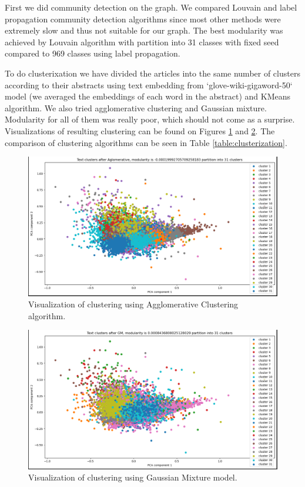 First we did community detection on the graph. We compared Louvain and label propagation community detection algorithms since most other methods were extremely slow and thus not suitable for our graph. The best modularity was achieved by Louvain algorithm with partition into 31 classes with fixed seed compared to 969 classes using label propagation. 

To do clusterixation we have divided the articles into the same number of clusters according to their abstracts using text embedding from `glove-wiki-gigaword-50` model (we averaged the embeddings of each word in the abstract) and KMeans algorithm. We also tried agglomerative clustering and Gaussian mixture. Modularity for all of them was really poor, which should not come as a surprise. Visualizations of resulting clustering can be found on Figures \ref{plot:clustering:agglomerative} and \ref{plot:clustering:gaussian_mixture}. The comparison of clustering algorithms can be seen in Table \ref{table:clusterization}.

\begin{figure}[h]
\centering
\includegraphics[width=1\linewidth]{Aglomerative.png}
\caption{Visualization of clustering using Agglomerative Clustering algorithm.}
\label{plot:clustering:agglomerative}
\end{figure}

\begin{figure}[h]
\centering
\includegraphics[width=1\linewidth]{gm.png}
\caption{Visualization of clustering using Gaussian Mixture model.}
\label{plot:clustering:gaussian_mixture}
\end{figure}


